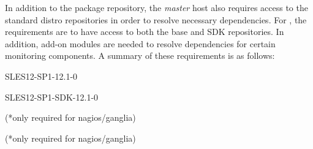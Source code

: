 In addition to the \OHPC{} package repository, the {\em master} host also
requires access to the standard distro repositories in order to resolve
necessary dependencies. For \baseOS{}, the requirements are to have access to
both the base and SDK repositories. In addition, add-on modules are needed to
resolve dependencies for certain monitoring components. A summary of these 
requirements is as follows:

\begin{itemize*}
\item SLES12-SP1-12.1-0
\item SLES12-SP1-SDK-12.1-0
\item
  \href{https://www.suse.com/products/server/features/modules/}{\color{blue}{Web
      and Scripting Module}} (*only required for nagios/ganglia)
\item
  \href{http://download.opensuse.org/repositories/server:/monitoring/SLE_12_SP1/}
       {\color{blue}{Server Monitoring Software}} (*only required for nagios/ganglia)
\end{itemize*}
